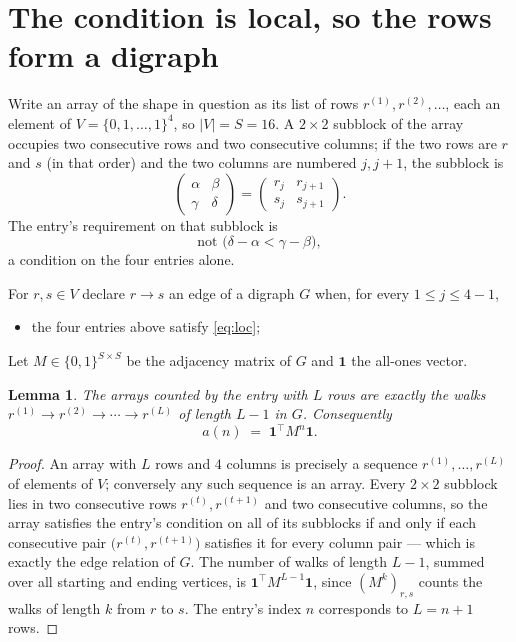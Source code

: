 \documentclass[11pt,a4paper]{article}
\theoremstyle{plain}
\newtheorem{lemma}[theorem]{Lemma}
\theoremstyle{definition}
\begin{document}
\section{The condition is local, so the rows form a digraph}

Write an array of the shape in question as its list of rows
$r^{(1)},r^{(2)},\dots$, each an element of
$V=\{0,1,\dots,1\}^{4}$, so $|V|=S=16$. A $2\times2$ subblock of the array
occupies two consecutive rows and two consecutive columns; if the two rows are $r$
and $s$ (in that order) and the two columns are numbered $j,j+1$,
the subblock is
\[
\begin{pmatrix}\alpha&\beta\\\gamma&\delta\end{pmatrix}=\begin{pmatrix}r_j&r_{j+1}\\s_j&s_{j+1}\end{pmatrix}.
\]
The entry's requirement on that subblock is
\begin{equation}\label{eq:loc}
\text{not }\bigl(\delta-\alpha<\gamma-\beta\bigr),
\end{equation}
a condition on the four entries alone.

For $r,s\in V$ declare $r\to s$ an edge of a digraph $G$ when, for every
$1\le j\le 4-1$,
\begin{itemize}
\item the four entries above satisfy \eqref{eq:loc};

\end{itemize}
Let $M\in\{0,1\}^{S\times S}$ be the adjacency matrix of $G$ and $\mathbf{1}$ the
all-ones vector.

\begin{lemma}\label{lem:walk}
The arrays counted by the entry with $L$ rows are exactly the walks
$r^{(1)}\to r^{(2)}\to\cdots\to r^{(L)}$ of length $L-1$ in $G$. Consequently
\[
a(n)\;=\;\mathbf{1}^{\!\top}M^{n}\mathbf{1} .
\]
\end{lemma}

\begin{proof}
An array with $L$ rows and $4$ columns is precisely a sequence
$r^{(1)},\dots,r^{(L)}$ of elements of $V$; conversely any such sequence is an array.
Every $2\times2$ subblock lies in two consecutive rows $r^{(t)},r^{(t+1)}$ and two
consecutive columns, so the array satisfies the entry's condition on all of its subblocks
if and only if each consecutive pair $\bigl(r^{(t)},r^{(t+1)}\bigr)$ satisfies it for
every column pair --- which is exactly the edge relation of $G$. The number of walks of
length $L-1$, summed over all starting and ending vertices, is
$\mathbf{1}^{\!\top}M^{L-1}\mathbf{1}$, since $(M^{k})_{r,s}$ counts the walks of
length $k$ from $r$ to $s$. The entry's index $n$ corresponds to $L=n+1$ rows.
\end{proof}
\end{document}
